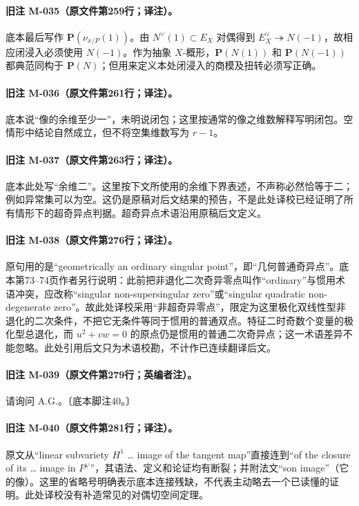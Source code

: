\documentclass[UTF8,a4paper]{ctexbook}
\begin{document}
\paragraph{旧注 M-035（原文件第259行；译注）。}
底本最后写作 $\mathbf P(\nu_{x/P}(1))$。由 $N^\vee(1)\subset E_X$ 对偶得到 $E_X^\vee\twoheadrightarrow N(-1)$，故相应闭浸入必须使用 $N(-1)$。作为抽象 $X$-概形，$\mathbf P(N(1))$ 和 $\mathbf P(N(-1))$ 都典范同构于 $\mathbf P(N)$；但用来定义本处闭浸入的商模及扭转必须写正确。

\paragraph{旧注 M-036（原文件第261行；译注）。}
底本说“像的余维至少一”，未明说闭包；这里按通常的像之维数解释写明闭包。空情形中结论自然成立，但不将空集维数写为 $r-1$。

\paragraph{旧注 M-037（原文件第263行；译注）。}
底本此处写“余维二”。这里按下文所使用的余维下界表述，不声称必然恰等于二；例如异常集可以为空。这仍是原稿对后文结果的预告，不是此处译校已经证明了所有情形下的超奇异点判据。超奇异点术语沿用原稿后文定义。

\paragraph{旧注 M-038（原文件第276行；译注）。}
原句用的是“geometrically an ordinary singular point”，即“几何普通奇异点”。底本第73--74页作者另行说明：此前把非退化二次奇异零点叫作“ordinary”与惯用术语冲突，应改称“singular non-supersingular zero”或“singular quadratic non-degenerate zero”。故此处译校采用“非超奇异零点”，限定为这里极化双线性型非退化的二次条件，不把它无条件等同于惯用的普通双点。特征二时奇数个变量的极化型总退化，而 $u^2+vw=0$ 的原点仍是惯用的普通二次奇异点；这一术语差异不能忽略。此处引用后文只为术语校勘，不计作已连续翻译后文。

\paragraph{旧注 M-039（原文件第279行；英编者注）。}
请询问 A.G.。〔底本脚注40。〕

\paragraph{旧注 M-040（原文件第281行；译注）。}
原文从“linear subvariety $H^1$ … image of the tangent map”直接连到“of the closure of its … image in $P^\vee$”，其语法、定义和论证均有断裂；并附法文“son image”（它的像）。这里的省略号明确表示底本连接残缺，不代表主动略去一个已读懂的证明。此处译校没有补造常见的对偶切空间定理。
\end{document}
